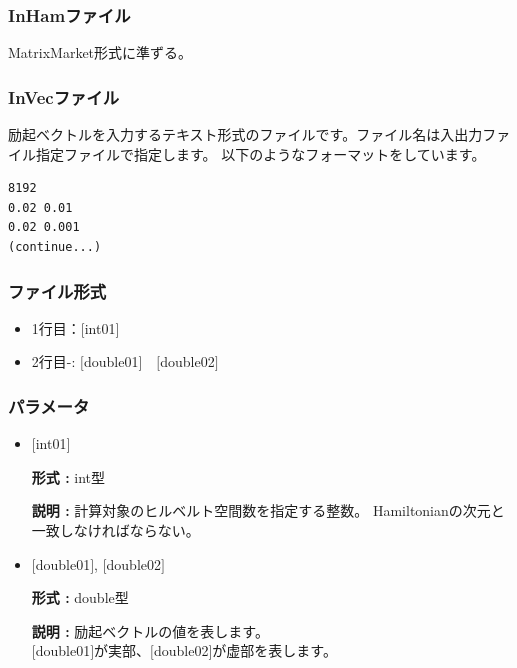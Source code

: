 \documentclass[12pt,titlepage]{jarticle}
\begin{document}
\newpage
\subsubsection{InHamファイル} \label{subsubsec:ham}
MatrixMarket形式に準ずる。

\subsubsection{InVecファイル}\label{subsubsec:vec}
励起ベクトルを入力するテキスト形式のファイルです。ファイル名は入出力ファイル指定ファイルで指定します。
以下のようなフォーマットをしています。
\\
\begin{minipage}{10cm}
\begin{screen}
\begin{verbatim}
8192
0.02 0.01
0.02 0.001
(continue...)
\end{verbatim}
\end{screen}
\end{minipage}


\subsubsection{ファイル形式}
\begin{itemize}
\item  1行目：$[$int01$]$
\item  2行目-: $[$double01$]$~~$[$double02$]$
\end{itemize}
\subsubsection{パラメータ}
\begin{itemize}
  
\item  $[$int01$]$
  
  {\bf 形式 :} int型
  
  {\bf 説明 :} 計算対象のヒルベルト空間数を指定する整数。
  Hamiltonianの次元と一致しなければならない。
 
\item  $[$double01$]$, $[$double02$]$
  
  {\bf 形式 :} double型 
  
  {\bf 説明 :} 励起ベクトルの値を表します。\\
  $[$double01$]$が実部、$[$double02$]$が虚部を表します。\\
\end{itemize}
\end{document}
